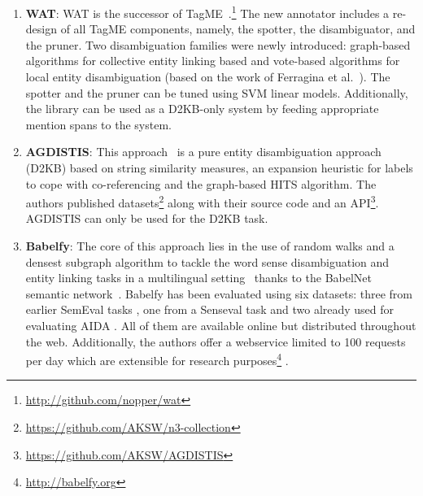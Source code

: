 \begin{enumerate}
\item \textbf{WAT}: WAT is the successor of TagME~\cite{TagMe2}.\footnote{\url{http://github.com/nopper/wat}}
The new annotator includes a re-design of all TagME components, namely, the spotter, the disambiguator, and the pruner. 
Two disambiguation families were newly introduced: graph-based algorithms for collective entity linking based %
and vote-based algorithms for local entity disambiguation (based on the work of Ferragina et al.~\cite{TagMe2}). 
The spotter and the pruner can be tuned using SVM linear models. 
Additionally, the library can be used as a D2KB-only system by feeding appropriate mention spans to the system. 

\item \textbf{AGDISTIS}: This approach~\cite{agdistis_iswc} is a pure entity disambiguation approach (D2KB) based on string similarity measures, an expansion heuristic for labels to cope with co-referencing and the graph-based HITS algorithm.
The authors published datasets\footnote{\url{https://github.com/AKSW/n3-collection}} along with their source code and an API\footnote{\url{https://github.com/AKSW/AGDISTIS}}.
AGDISTIS can only be used for the D2KB task.

\item \textbf{Babelfy}: The core of this approach lies in the use of random walks and a densest subgraph algorithm to tackle the word sense disambiguation and entity linking tasks in a multilingual setting~\cite{babelfy} thanks to the BabelNet semantic network~\cite{NavigliPonzetto:12aij}.
Babelfy has been evaluated using six datasets: three from earlier SemEval tasks \cite{pradhan2007semeval,NavigliLH:2007,Naviglietal:13}, one from a Senseval task \cite{snyder2004english} and two already used for evaluating AIDA \cite{AIDA,HoffartSNTW:2012}.
All of them are available online but distributed throughout the web. 
Additionally, the authors offer a webservice limited to 100 requests per day which are extensible for research purposes\footnote{\url{http://babelfy.org}} \cite{BabelfyAPI}.


\end{enumerate}

